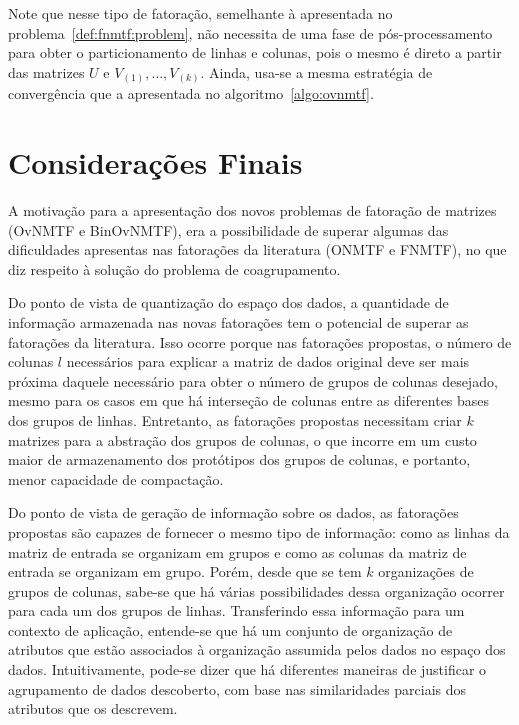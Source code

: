 \documentclass[
    12pt,                %
    oneside,            %
    a4paper,            %
    english,            %
    brazil                %
    ]{abntex2ppgsi}
\begin{document}
Note que nesse tipo de fatoração, semelhante à apresentada no problema~\ref{def:fnmtf:problem}, não necessita de uma fase de pós-processamento para obter o particionamento de linhas e colunas, pois o mesmo é direto a partir das matrizes $U$ e $V_{(1)}, \dots, V_{(k)}$.
Ainda, usa-se a mesma estratégia de convergência que a apresentada no algoritmo~\ref{algo:ovnmtf}.

\section{Considerações Finais}

A motivação para a apresentação dos novos problemas de fatoração de matrizes (OvNMTF e BinOvNMTF), era a possibilidade de superar algumas das dificuldades apresentas nas fatorações da literatura (ONMTF e FNMTF), no que diz respeito à solução do problema de coagrupamento.

Do ponto de vista de quantização do espaço dos dados, a quantidade de informação armazenada nas novas fatorações tem o potencial de superar as fatorações da literatura.
Isso ocorre porque nas fatorações propostas, o número de colunas $l$ necessários para explicar a matriz de dados original deve ser mais próxima daquele necessário para obter o número de grupos de colunas desejado, mesmo para os casos em que há interseção de colunas entre as diferentes bases dos grupos de linhas.
Entretanto, as fatorações propostas necessitam criar $k$ matrizes para a abstração dos grupos de colunas, o que incorre em um custo maior de armazenamento dos protótipos dos grupos de colunas, e portanto, menor capacidade de compactação.

Do ponto de vista de geração de informação sobre os dados, as fatorações propostas são capazes de fornecer o mesmo tipo de informação: como as linhas da matriz de entrada se organizam em grupos e como as colunas da matriz de entrada se organizam em grupo.
Porém, desde que se tem $k$ organizações de grupos de colunas, sabe-se que há várias possibilidades dessa organização ocorrer para cada um dos grupos de linhas.
Transferindo essa informação para um contexto de aplicação, entende-se que há um conjunto de organização de atributos que estão associados à organização assumida pelos dados no espaço dos dados.
Intuitivamente, pode-se dizer que há diferentes maneiras de justificar o agrupamento de dados descoberto, com base nas similaridades parciais dos atributos que os descrevem.
\end{document}
